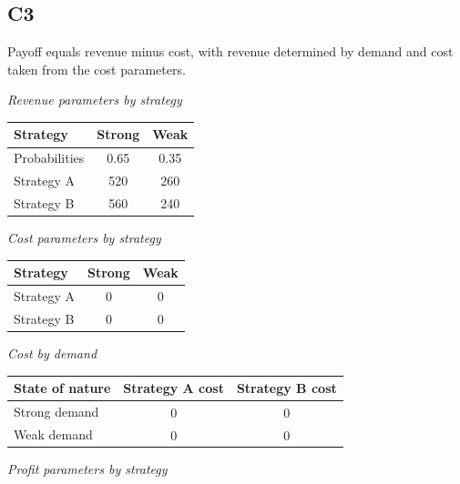 \begin{ExamProblems}
		\subsection*{C3}
		Payoff equals revenue minus cost, with revenue determined by demand and cost taken from the cost parameters.
		\begin{center}
			\textit{Revenue parameters by strategy}
			\begin{tabular}{l c c}
				\toprule
				Strategy & Strong & Weak \\
				\midrule
				Probabilities & 0.65 & 0.35 \\
				Strategy A & 520 & 260 \\
				Strategy B & 560 & 240 \\
				\bottomrule
			\end{tabular}
		\end{center}
		\begin{center}
			\textit{Cost parameters by strategy}
			\begin{tabular}{l c c}
				\toprule
				Strategy & Strong & Weak \\
				\midrule
				Strategy A & 0 & 0 \\
				Strategy B & 0 & 0 \\
				\bottomrule
			\end{tabular}
		\end{center}
		\begin{center}
			\textit{Cost by demand}
			\begin{tabular}{l c c}
				\toprule
				State of nature & Strategy A cost & Strategy B cost \\
				\midrule
				Strong demand &
				$\begin{array}{l}
					0
				\end{array}$ &
				$\begin{array}{l}
					0
				\end{array}$ \\
				Weak demand &
				$\begin{array}{l}
					0
				\end{array}$ &
				$\begin{array}{l}
					0
				\end{array}$ \\
				\bottomrule
			\end{tabular}
		\end{center}
		\begin{center}
			\textit{Profit parameters by strategy}
			\begin{tabular}{l p{0.17\linewidth} p{0.2\linewidth} p{0.2\linewidth}}

\end{tabular}
\end{center}
\end{ExamProblems}

